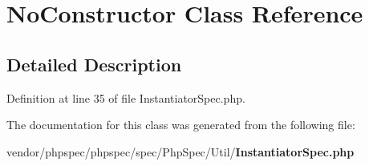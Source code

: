 \section{No\+Constructor Class Reference}
\label{classspec_1_1_php_spec_1_1_util_1_1_no_constructor}


\subsection{Detailed Description}


Definition at line 35 of file Instantiator\+Spec.\+php.



The documentation for this class was generated from the following file\+:\begin{DoxyCompactItemize}
\item 
vendor/phpspec/phpspec/spec/\+Php\+Spec/\+Util/{\bf Instantiator\+Spec.\+php}\end{DoxyCompactItemize}
